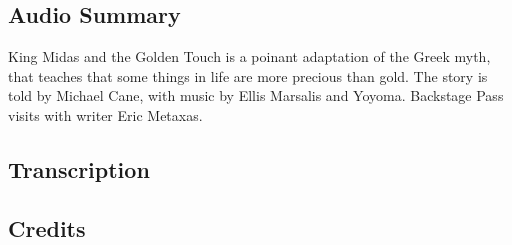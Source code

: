 \subsection{Audio Summary}

King Midas and the Golden Touch is a poinant adaptation of the Greek myth, that teaches that some things in life are more precious than gold. The story is told by Michael Cane, with music by Ellis Marsalis and Yoyoma. Backstage Pass visits with writer Eric Metaxas.

\subsection{Transcription}

\subsection{Credits}
